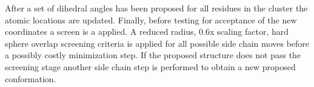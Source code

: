 After a set of dihedral angles has been proposed for all residues in the cluster the atomic locations are updated.
Finally, before testing for acceptance of the new coordinates a screen is a applied.
A reduced radius, 0.6x scaling factor, hard sphere overlap screening criteria is applied for all possible side chain moves before a possibly costly minimization step.
If the proposed structure does not pass the screening stage another side chain step is performed to obtain a new proposed conformation.



